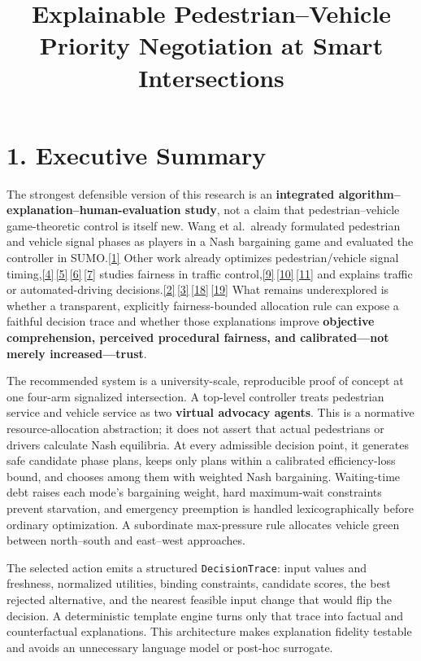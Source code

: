 \documentclass[
  english,
  11pt,
  a4paper,
]{article}
\title{Explainable Pedestrian--Vehicle Priority Negotiation at Smart
Intersections}
\author{}
\date{}
\begin{document}
\maketitle

{
\setcounter{tocdepth}{2}
\tableofcontents
}
\section{1. Executive Summary}\label{executive-summary}

The strongest defensible version of this research is an
\textbf{integrated algorithm--explanation--human-evaluation study}, not
a claim that pedestrian--vehicle game-theoretic control is itself new.
Wang et al.~already formulated pedestrian and vehicle signal phases as
players in a Nash bargaining game and evaluated the controller in
SUMO.\hyperref[source-1]{[1]} Other work already optimizes
pedestrian/vehicle signal
timing,\hyperref[source-4]{[4]}\,\hyperref[source-5]{[5]}\,\hyperref[source-6]{[6]}\,\hyperref[source-7]{[7]}
studies fairness in traffic
control,\hyperref[source-9]{[9]}\,\hyperref[source-10]{[10]}\,\hyperref[source-11]{[11]}
and explains traffic or automated-driving
decisions.\hyperref[source-2]{[2]}\,\hyperref[source-3]{[3]}\,\hyperref[source-18]{[18]}\,\hyperref[source-19]{[19]}
What remains underexplored is whether a transparent, explicitly
fairness-bounded allocation rule can expose a faithful decision trace
and whether those explanations improve \textbf{objective comprehension,
perceived procedural fairness, and calibrated---not merely
increased---trust}.

The recommended system is a university-scale, reproducible proof of
concept at one four-arm signalized intersection. A top-level controller
treats pedestrian service and vehicle service as two \textbf{virtual
advocacy agents}. This is a normative resource-allocation abstraction;
it does not assert that actual pedestrians or drivers calculate Nash
equilibria. At every admissible decision point, it generates safe
candidate phase plans, keeps only plans within a calibrated
efficiency-loss bound, and chooses among them with weighted Nash
bargaining. Waiting-time debt raises each mode's bargaining weight, hard
maximum-wait constraints prevent starvation, and emergency preemption is
handled lexicographically before ordinary optimization. A subordinate
max-pressure rule allocates vehicle green between north--south and
east--west approaches.

The selected action emits a structured \texttt{DecisionTrace}: input
values and freshness, normalized utilities, binding constraints,
candidate scores, the best rejected alternative, and the nearest
feasible input change that would flip the decision. A deterministic
template engine turns only that trace into factual and counterfactual
explanations. This architecture makes explanation fidelity testable and
avoids an unnecessary language model or post-hoc surrogate.
\end{document}
